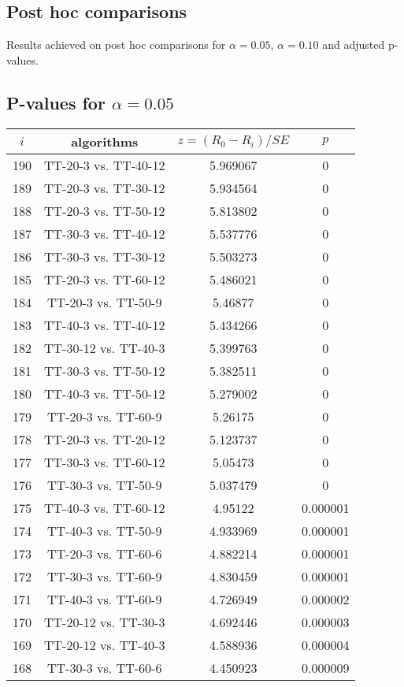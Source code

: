 \documentclass[a4paper,10pt]{article}
\begin{document}
\begin{landscape}
\section{Post hoc comparisons}

Results achieved on post hoc comparisons for $\alpha = 0.05$, $\alpha = 0.10$ and adjusted p-values.

\subsection{P-values for $\alpha=0.05$}

\begin{table}[!htp]
\centering\scriptsize
\begin{tabular}{cccc}
$i$&algorithms&$z=(R_0 - R_i)/SE$&$p$\\
\hline190&TT-20-3 vs. TT-40-12&5.969067&0\\
189&TT-20-3 vs. TT-30-12&5.934564&0\\
188&TT-20-3 vs. TT-50-12&5.813802&0\\
187&TT-30-3 vs. TT-40-12&5.537776&0\\
186&TT-30-3 vs. TT-30-12&5.503273&0\\
185&TT-20-3 vs. TT-60-12&5.486021&0\\
184&TT-20-3 vs. TT-50-9&5.46877&0\\
183&TT-40-3 vs. TT-40-12&5.434266&0\\
182&TT-30-12 vs. TT-40-3&5.399763&0\\
181&TT-30-3 vs. TT-50-12&5.382511&0\\
180&TT-40-3 vs. TT-50-12&5.279002&0\\
179&TT-20-3 vs. TT-60-9&5.26175&0\\
178&TT-20-3 vs. TT-20-12&5.123737&0\\
177&TT-30-3 vs. TT-60-12&5.05473&0\\
176&TT-30-3 vs. TT-50-9&5.037479&0\\
175&TT-40-3 vs. TT-60-12&4.95122&0.000001\\
174&TT-40-3 vs. TT-50-9&4.933969&0.000001\\
173&TT-20-3 vs. TT-60-6&4.882214&0.000001\\
172&TT-30-3 vs. TT-60-9&4.830459&0.000001\\
171&TT-40-3 vs. TT-60-9&4.726949&0.000002\\
170&TT-20-12 vs. TT-30-3&4.692446&0.000003\\
169&TT-20-12 vs. TT-40-3&4.588936&0.000004\\
168&TT-30-3 vs. TT-60-6&4.450923&0.000009\\

\end{tabular}
\end{table}
\end{landscape}
\end{document}
